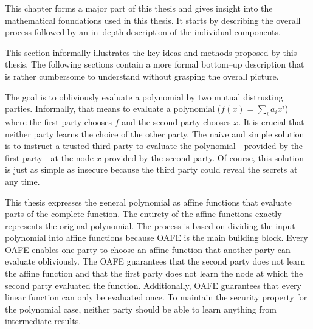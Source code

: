 \label{sec:methods}

This chapter forms a major part of this thesis and gives insight into the
mathematical foundations used in this thesis. It starts by describing the
overall process followed by an in--depth description of the individual
components.


%
%
\label{sec:illustration}

This section informally illustrates the key ideas and methods proposed by this
thesis. The following sections contain a more formal bottom--up description that
is rather cumbersome to understand without grasping the overall picture.

The goal is to obliviously evaluate a polynomial by two mutual distrusting
parties. Informally, that means to evaluate a polynomial ($f(x) = \sum_i
a_ix^i$) where the first party chooses $f$ and the second party chooses $x$. It
is crucial that neither party learns the choice of the other party. The naive
and simple solution is to instruct a trusted third party to evaluate the
polynomial---provided by the first party---at the node $x$ provided by the
second party. Of course, this solution is just as simple as insecure because the
third party could reveal the secrets at any time.

This thesis expresses the general polynomial as affine functions that evaluate
parts of the complete function. The entirety of the affine functions exactly
represents the original polynomial. The process is based on dividing the input
polynomial into affine functions because  {OAFE} \cite{davidgoliath} is the main building block.
Every OAFE enables one party to choose an affine function that another party can
evaluate obliviously. The OAFE guarantees that the second party does not learn
the affine function and that the first party does not learn the node at which
the second party evaluated the function. Additionally, OAFE guarantees that
every linear function can only be evaluated once. To maintain the security
property for the polynomial case, neither party should be able to learn
anything from intermediate results.

